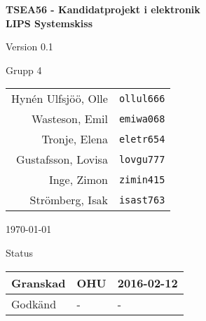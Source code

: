 \documentclass[11pt]{article}
\begin{document}
\begin{titlepage}
\begin{center}

{\Large\bfseries TSEA56 - Kandidatprojekt i elektronik \\ LIPS Systemskiss}

\vspace{5em}

Version 0.1

\vspace{5em}
Grupp 4 \\
\begin{tabular}{rl}
Hynén Ulfsjöö, Olle&\verb+ollul666+
\\
Wasteson, Emil&\verb+emiwa068+
\\
Tronje, Elena&\verb+eletr654+
\\
Gustafsson, Lovisa&\verb+lovgu777+
\\
Inge, Zimon&\verb+zimin415+
\\
Strömberg, Isak&\verb+isast763+
\\
\end{tabular}

\vspace{5em}
\today

\vspace{16em}
Status
\begin{longtable}{|l|l|l|} \hline

Granskad & OHU & 2016-02-12 \\ \hline
Godkänd & - & - \\ \hline
 
\end{longtable}

\end{center}
\end{titlepage}
\end{document}
